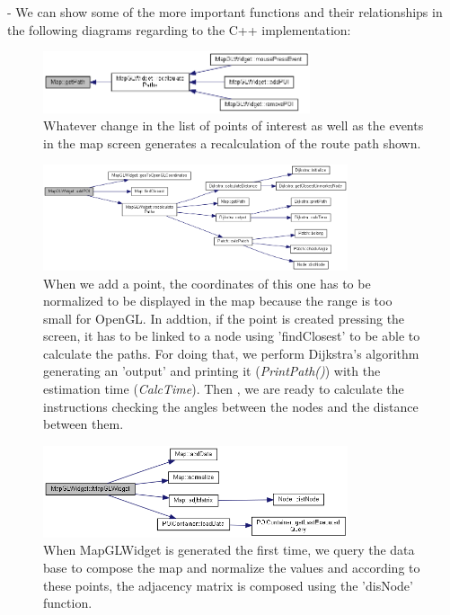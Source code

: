 \documentclass{article}
\begin{document}
- We can show some of the more important functions and their relationships in the following diagrams regarding to the C++ implementation:

\begin{figure}[h]
\centering
\includegraphics[width=0.7\textwidth]{2.png}
\caption{Whatever change in the list of points of interest as well as the events in the map screen generates a recalculation of the route path shown.}
\end{figure}

\begin{figure}[h]
\centering
\includegraphics[width=0.8\textwidth]{4.png}
\caption{When we add a point, the coordinates of this one has to be normalized to be displayed in the map because the range is too small for OpenGL. In addtion, if the point is created pressing the screen, it has to be linked to a node using 'findClosest' to be able to calculate the paths. For doing that, we perform Dijkstra's algorithm generating an 'output' and printing it (\textit{PrintPath()}) with the estimation time (\textit{CalcTime}). Then , we are ready to calculate the instructions checking the angles between the nodes and the distance between them.}
\end{figure}

\begin{figure}[h]
\centering
\includegraphics[width=0.8\textwidth]{6.png}
\caption{When MapGLWidget is generated the first time, we query the data base to compose the map and normalize the values and according to these points, the adjacency matrix is composed using the 'disNode' function.}
\end{figure}
\end{document}
